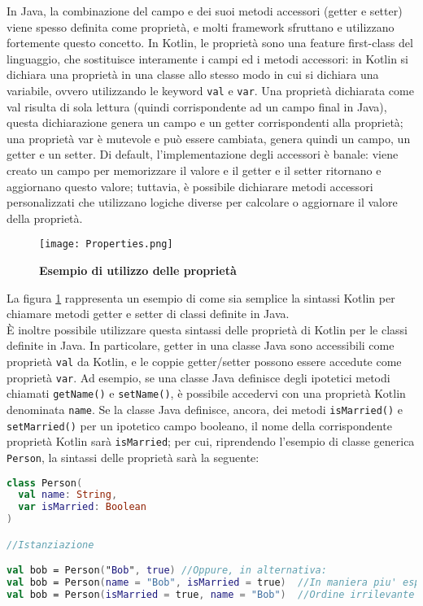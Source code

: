 In Java, la combinazione del campo e dei suoi metodi accessori (getter e setter) viene spesso definita come proprietà, e molti framework sfruttano e utilizzano fortemente questo concetto. In Kotlin, le proprietà sono una feature first-class del linguaggio, che sostituisce interamente i campi ed i metodi accessori: in Kotlin si dichiara una proprietà in una classe allo stesso modo in cui si dichiara una variabile, ovvero utilizzando le keyword \texttt{val} e \texttt{var}. Una proprietà dichiarata come val risulta di sola lettura (quindi corrispondente ad un campo final in Java), questa dichiarazione genera un campo e un getter corrispondenti alla proprietà; una proprietà var è mutevole e può essere cambiata, genera quindi un campo, un getter e un setter. Di default, l'implementazione degli accessori è banale: viene creato un campo per memorizzare il valore e il getter e il setter ritornano e aggiornano questo valore; tuttavia, è possibile dichiarare metodi accessori personalizzati che utilizzano logiche diverse per calcolare o aggiornare il valore della proprietà.\\

\begin{figure}[ht]
  \centering
  \texttt{[image: Properties.png]}
  \caption{{\bfseries Esempio di utilizzo delle proprietà}}
  \label{KotlinProperties}
\end{figure}

La figura \ref{KotlinProperties} rappresenta un esempio di come sia semplice la sintassi Kotlin per chiamare metodi getter e setter di classi definite in Java.\\

È inoltre possibile utilizzare questa sintassi delle proprietà di Kotlin per le classi definite in Java.
In particolare, getter in una classe Java sono accessibili come proprietà \texttt{val} da Kotlin, e le coppie getter/setter possono essere accedute come proprietà \texttt{var}. Ad esempio, se una classe Java definisce degli ipotetici metodi chiamati \texttt{getName()} e \texttt{setName()}, è possibile accedervi con una proprietà Kotlin denominata \texttt{name}. Se la classe Java definisce, ancora, dei metodi \texttt{isMarried()} e \texttt{setMarried()} per un ipotetico campo booleano, il nome della corrispondente proprietà Kotlin sarà \texttt{isMarried}; per cui, riprendendo l'esempio di classe generica \texttt{Person}, la sintassi delle proprietà sarà la seguente:\\

\begin{lstlisting}[caption={Utilizzo delle proprietà di una classe Kotlin}, captionpos=b, label={lst:exampleProperties}, language=Kotlin]
class Person(
  val name: String,
  var isMarried: Boolean
)

//Istanziazione

val bob = Person("Bob", true) //Oppure, in alternativa:
val bob = Person(name = "Bob", isMarried = true)  //In maniera piu' espressiva
val bob = Person(isMarried = true, name = "Bob")  //Ordine irrilevante con questa sintassi
\end{lstlisting}

